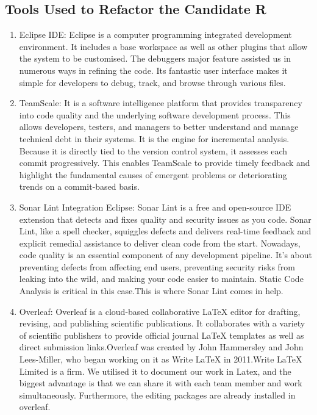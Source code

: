 \documentclass[12pt,english]{article}
\begin{document}
 \subsection{Tools Used to Refactor the Candidate R}
    \begin{enumerate}
            \item Eclipse IDE: Eclipse is a computer programming integrated development environment. It includes a base workspace as well as other plugins that allow the system to be customised. The debuggers major feature assisted us in numerous ways in refining the code. Its fantastic user interface makes it simple for developers to debug, track, and browse through various files.

            \item TeamScale: It is a software intelligence platform that provides transparency into code quality and the underlying software development process. This allows developers, testers, and managers to better understand and manage technical debt in their systems. It is the engine for incremental analysis. Because it is directly tied to the version control system, it assesses each commit progressively. This enables TeamScale to provide timely feedback and highlight the fundamental causes of emergent problems or deteriorating trends on a commit-based basis.

            \item Sonar Lint Integration Eclipse: Sonar Lint is a free and open-source IDE extension that detects and fixes quality and security issues as you code. Sonar Lint, like a spell checker, squiggles defects and delivers real-time feedback and explicit remedial assistance to deliver clean code from the start. Nowadays, code quality is an essential component of any development pipeline. It's about preventing defects from affecting end users, preventing security risks from leaking into the wild, and making your code easier to maintain. Static Code Analysis is critical in this case.This is where Sonar Lint comes in help.

            \item Overleaf: Overleaf is a cloud-based collaborative LaTeX editor for drafting, revising, and publishing scientific publications. It collaborates with a variety of scientific publishers to provide official journal LaTeX templates as well as direct submission links.Overleaf was created by John Hammersley and John Lees-Miller, who began working on it as Write LaTeX in 2011.Write LaTeX Limited is a firm. We utilised it to document our work in Latex, and the biggest advantage is that we can share it with each team member and work simultaneously. Furthermore, the editing packages are already installed in overleaf.


\end{enumerate}
\end{document}
